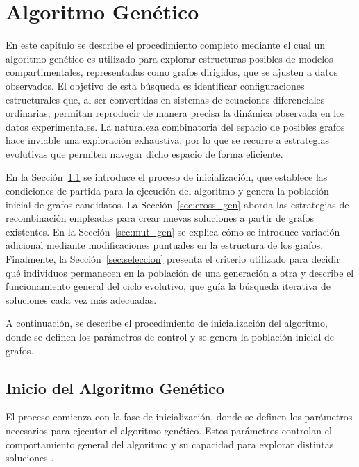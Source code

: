\usetikzlibrary{matrix}
\chapter{Algoritmo Gen\'etico}\label{chapter:ga}

En este capítulo se describe el procedimiento completo mediante el cual un algoritmo genético es utilizado para explorar estructuras posibles de modelos 
compartimentales, representadas como grafos dirigidos, que se ajusten a datos observados. El objetivo de esta búsqueda es identificar configuraciones 
estructurales que, al ser convertidas en sistemas de ecuaciones diferenciales ordinarias, permitan reproducir de manera precisa la dinámica observada en 
los datos experimentales. La naturaleza combinatoria del espacio de posibles grafos hace inviable una exploración exhaustiva, por lo que se recurre a estrategias 
evolutivas que permiten navegar dicho espacio de forma eficiente.

En la Sección~\ref{sec:init_gen} se introduce el proceso de inicialización, que establece las condiciones de partida para la ejecución del algoritmo y genera la 
población inicial de grafos candidatos. La Sección~\ref{sec:cross_gen} aborda las estrategias de recombinación empleadas para crear nuevas soluciones a partir de 
grafos existentes. En la Sección~\ref{sec:mut_gen} se explica cómo se introduce variación adicional mediante modificaciones puntuales en la estructura de los grafos. 
Finalmente, la Sección~\ref{sec:seleccion} presenta el criterio utilizado para decidir qué individuos permanecen en la población de una generación a otra y describe 
el funcionamiento general del ciclo evolutivo, que guía la búsqueda iterativa de soluciones cada vez más adecuadas.

A continuación, se describe el procedimiento de inicialización del algoritmo, donde se definen los parámetros de control y se genera la población inicial de grafos.

\section{Inicio del Algoritmo Genético}
\label{sec:init_gen}

El proceso comienza con la fase de inicialización, donde se definen los parámetros necesarios para ejecutar el algoritmo genético. Estos parámetros controlan 
el comportamiento general del algoritmo y su capacidad para explorar distintas soluciones \cite{Goldberg1989, Eiben2015}.


